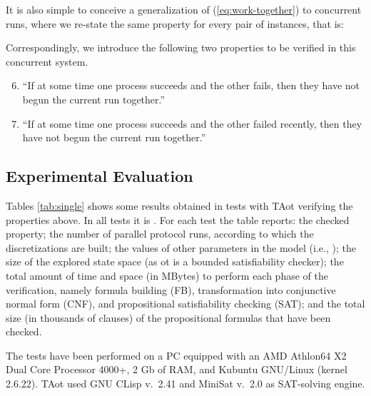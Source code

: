 \documentclass[a4paper]{article}
\newcommand{\frf}[1]{(\ref{#1})}
\newcommand{\zot}{ot}
\newcommand{\tazot}{\textsf{TA}ot}
\theoremstyle{plain}
\theoremstyle{definition}
\begin{document}
It is also simple to conceive a generalization of \frf{eq:work-together} to  concurrent runs, where we re-state the same property for every pair of instances, that is:



Correspondingly, we introduce the following two properties to be verified in this concurrent system.
\begin{enumerate}
\setcounter{enumi}{5}
\item \label{pc1}
  ``If at some time one process succeeds and the other fails, then they have not begun the current run together.''



\item \label{pc2}
  ``If at some time one process succeeds and the other failed recently, then they have not begun the current run together.''

\end{enumerate}








\subsection{Experimental Evaluation}
Tables \ref{tab:single} shows some results obtained in tests with \tazot{} verifying the properties above.
In all tests it is .
For each test the table reports: the checked property; the number  of parallel protocol runs, according to which the discretizations are built; the values of other parameters in the model (i.e., ); the size  of the explored state space (as \zot{} is a bounded satisfiability checker); the total amount of time and space (in MBytes) to perform each phase of the verification, namely formula building (\textsc{FB}), transformation into conjunctive normal form (\textsc{CNF}), and propositional satisfiability checking (\textsc{SAT}); and the total size (in thousands of clauses) of the propositional formulas that have been checked.

The tests have been performed on a PC equipped with an AMD Athlon64 X2 Dual Core Processor 4000+, 2 Gb of RAM, and Kubuntu GNU/Linux (kernel 2.6.22).
\tazot{} used GNU CLisp v.~2.41 and MiniSat v.~2.0 as SAT-solving engine.
\end{document}
